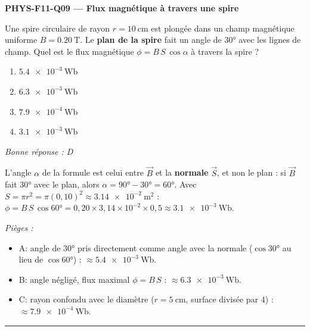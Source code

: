 \documentclass[11pt,a4paper]{article}
\newcommand{\vv}[1]{\vec{#1}}\newcommand{\ds}{\displaystyle}
\begin{document}
\noindent\textbf{PHYS-F11-Q09 --- Flux magnétique à travers une spire}\par
Une spire circulaire de rayon $r=\qty{10}{\centi\metre}$ est plongée dans un champ magnétique uniforme $B=\qty{0.20}{\tesla}$. Le \textbf{plan de la spire} fait un angle de $\ang{30}$ avec les lignes de champ. Quel est le flux magnétique $\phi=B\,S\,\cos\alpha$ à travers la spire ?
\begin{center}
\end{center}
\begin{enumerate}[label=\Alph*)]
\item $\qty{5.4e-3}{\weber}$
\item $\qty{6.3e-3}{\weber}$
\item $\qty{7.9e-4}{\weber}$
\item $\qty{3.1e-3}{\weber}$
\end{enumerate}
\textit{Bonne réponse : D}\par
L'angle $\alpha$ de la formule est celui entre $\vv{B}$ et la \textbf{normale} $\vv{S}$, et non le plan : si $\vv{B}$ fait $\ang{30}$ avec le plan, alors $\alpha=\ang{90}-\ang{30}=\ang{60}$. Avec $S=\pi r^{2}=\pi(0{,}10)^{2}\approx\qty{3.14e-2}{\metre\squared}$ : $\phi=B\,S\,\cos\ang{60}=0{,}20\times3{,}14\times10^{-2}\times0{,}5\approx\qty{3.1e-3}{\weber}$.\par
\textit{Pièges :}
\begin{itemize}
\item A: angle de $\ang{30}$ pris directement comme angle avec la normale ($\cos\ang{30}$ au lieu de $\cos\ang{60}$) : $\approx\qty{5.4e-3}{\weber}$.
\item B: angle négligé, flux maximal $\phi=B\,S$ : $\approx\qty{6.3e-3}{\weber}$.
\item C: rayon confondu avec le diamètre ($r=\qty{5}{\centi\metre}$, surface divisée par $4$) : $\approx\qty{7.9e-4}{\weber}$.
\end{itemize}
\vspace{8pt}\hrule\vspace{8pt}
\end{document}
